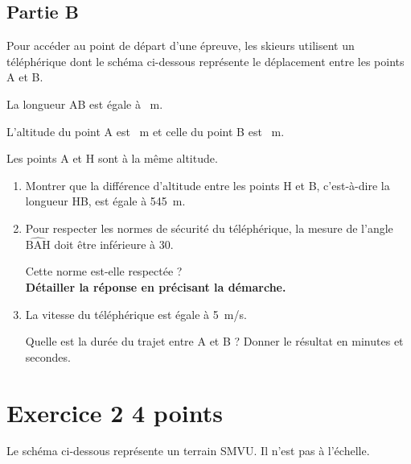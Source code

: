 \documentclass[12pt,a4paper,french]{article}
\begin{document}
\subsection*{Partie B}

Pour accéder au point de départ d'une épreuve, les skieurs utilisent un téléphérique dont le schéma ci-dessous représente le déplacement entre les points A et B.

\begin{center}
\end{center}

La longueur AB est égale à ~m.

L'altitude du point A est ~m et celle du point B est ~m.

Les points A et H sont à la même altitude.

\begin{enumerate}
	\item Montrer que la différence d'altitude entre les points H et B, c'est-à-dire la longueur HB, est égale à 545~m.
	\item Pour respecter les normes de sécurité du téléphérique, la mesure de l'angle $\widehat{\mathrm{BAH}}$ doit être inférieure à 30\degres.

	Cette norme est-elle respectée ?\\
	\textbf{Détailler la réponse en précisant la démarche.}
	\item La vitesse du téléphérique est égale à 5~m/s.

	Quelle est la durée du trajet entre A et B ? Donner le résultat en minutes et secondes.
\end{enumerate}

\section*{Exercice 2 \hfill 4 points}

Le schéma ci-dessous représente un terrain SMVU. Il n'est pas à l'échelle.
\end{document}

